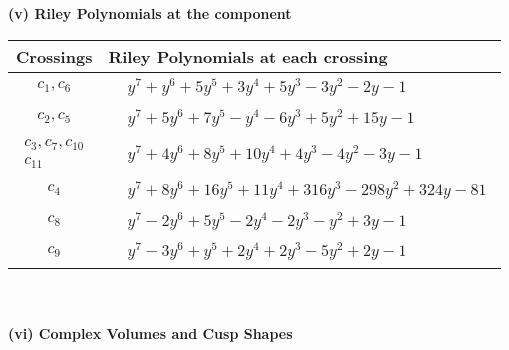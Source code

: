 \documentclass[1p]{elsarticle_modified}
\theoremstyle{definition}
\begin{document}
\newpage\renewcommand{\arraystretch}{1}
\flushleft \textbf{(v) Riley Polynomials at the component}\newline \\
\begin{tabular}{m{50pt}|m{274pt}}
Crossings & \hspace{64pt}Riley Polynomials at each crossing \\
\hline $$\begin{aligned}c_{1},c_{6}\end{aligned}$$&$\begin{aligned}
&y^7+y^6+5 y^5+3 y^4+5 y^3-3 y^2-2 y-1
\end{aligned}$\\
\hline $$\begin{aligned}c_{2},c_{5}\end{aligned}$$&$\begin{aligned}
&y^7+5 y^6+7 y^5- y^4-6 y^3+5 y^2+15 y-1
\end{aligned}$\\
\hline $$\begin{aligned}c_{3},c_{7},c_{10}\\c_{11}\end{aligned}$$&$\begin{aligned}
&y^7+4 y^6+8 y^5+10 y^4+4 y^3-4 y^2-3 y-1
\end{aligned}$\\
\hline $$\begin{aligned}c_{4}\end{aligned}$$&$\begin{aligned}
&y^7+8 y^6+16 y^5+11 y^4+316 y^3-298 y^2+324 y-81
\end{aligned}$\\
\hline $$\begin{aligned}c_{8}\end{aligned}$$&$\begin{aligned}
&y^7-2 y^6+5 y^5-2 y^4-2 y^3- y^2+3 y-1
\end{aligned}$\\
\hline $$\begin{aligned}c_{9}\end{aligned}$$&$\begin{aligned}
&y^7-3 y^6+y^5+2 y^4+2 y^3-5 y^2+2 y-1
\end{aligned}$\\
\hline
\end{tabular}\\~\\
\newpage\flushleft \textbf{(vi) Complex Volumes and Cusp Shapes}
\end{document}
